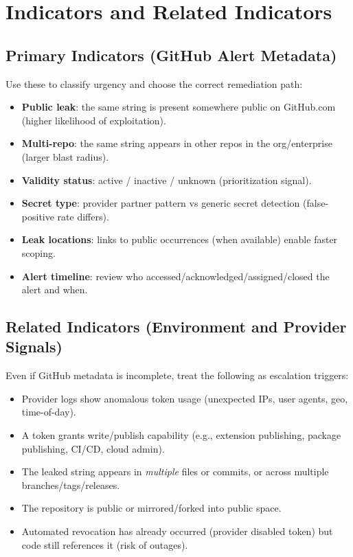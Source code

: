 \documentclass[11pt]{article}
\newcommand{\term}[1]{\textbf{#1}}
\begin{document}
\section{Indicators and Related Indicators}
\subsection{Primary Indicators (GitHub Alert Metadata)}
Use these to classify urgency and choose the correct remediation path:
\begin{itemize}
  \item \term{Public leak}: the same string is present somewhere public on GitHub.com (higher likelihood of exploitation).
  \item \term{Multi-repo}: the same string appears in other repos in the org/enterprise (larger blast radius).
  \item \term{Validity status}: active / inactive / unknown (prioritization signal).
  \item \term{Secret type}: provider partner pattern vs generic secret detection (false-positive rate differs).
  \item \term{Leak locations}: links to public occurrences (when available) enable faster scoping.
  \item \term{Alert timeline}: review who accessed/acknowledged/assigned/closed the alert and when.
\end{itemize}

\subsection{Related Indicators (Environment and Provider Signals)}
Even if GitHub metadata is incomplete, treat the following as escalation triggers:
\begin{itemize}
  \item Provider logs show anomalous token usage (unexpected IPs, user agents, geo, time-of-day).
  \item A token grants write/publish capability (e.g., extension publishing, package publishing, CI/CD, cloud admin).
  \item The leaked string appears in \emph{multiple} files or commits, or across multiple branches/tags/releases.
  \item The repository is public or mirrored/forked into public space.
  \item Automated revocation has already occurred (provider disabled token) but code still references it (risk of outages).
\end{itemize}
\end{document}
